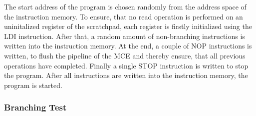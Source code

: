 The start address of the program is chosen randomly from the address space of the instruction memory.
To ensure, that no read operation is performed on an uninitalized register of the scratchpad, each register is firstly initialized using the LDI instruction.
After that, a random amount of non-branching instructions is written into the instruction memory.
At the end, a couple of NOP instructions is written, to flush the pipeline of the MCE and thereby ensure, that all previous operations have completed.
Finally a single STOP instruction is written to stop the program.
After all instructions are written into the instruction memory, the program is started.



\subsubsection{Branching Test}

